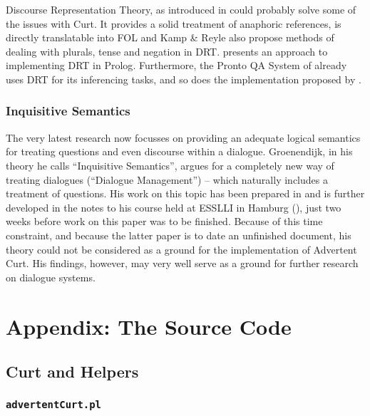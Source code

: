 \documentclass[notitlepage,twoside,a4paper]{scrreprt}
\newcommand{\abbr}{\textsf} %
\newcommand{\code}[1]{\texttt{#1}} %
\newcommand{\pn}{\textsf} %
\newcommand{\curt}{\pn{Curt}}
\newcommand{\acurt}{\pn{Advertent Curt}}
\newcommand{\prol}{\pn{Prolog}}
\theoremstyle{remark}
\theoremstyle{remark}
\theoremstyle{definition}
\theoremstyle{definition}
\begin{document}
Discourse Representation Theory, as introduced in
\cite{kampreyle:drt} could probably solve some of the issues with \curt{}. It
provides a solid treatment of anaphoric references, is directly translatable
into \abbr{FOL} and Kamp \& Reyle also propose methods of dealing with plurals,
tense and negation in \abbr{DRT}.
\cite{blackburnbos:cl2} presents an approach to implementing \abbr{DRT} in
\prol{}. Furthermore, the \pn{Pronto QA System} of \cite{prontoqa} already uses
\abbr{DRT} for its inferencing tasks, and so does the implementation proposed by
\cite{bosgabdsil}.

\subsection{Inquisitive Semantics}\label{sec:altq}

The very latest research now focusses on providing an adequate logical semantics
for treating questions and even discourse within a dialogue. Groenendijk, in his
theory he calls ``Inquisitive Semantics'', argues for a completely new way of
treating dialogues (``Dialogue Management'') -- which naturally includes a
treatment of questions. His work on this topic has been prepared in \cite{g:is}
and is further developed in the notes to his course held at ESSLLI in Hamburg
(\cite{g:isdm}), just two weeks before work on this paper was to be finished.
Because of this time constraint, and because the latter paper is to date an
unfinished document, his theory could not be considered as a ground for the
implementation of \acurt. His findings, however, may very well serve as a ground
for further research on dialogue systems.



\appendix

\chapter{Appendix: The Source Code}

\lstset{basicstyle=\tiny\ttfamily}

\section{Curt and Helpers}
\subsection{\code{advertentCurt.pl}}
\end{document}

